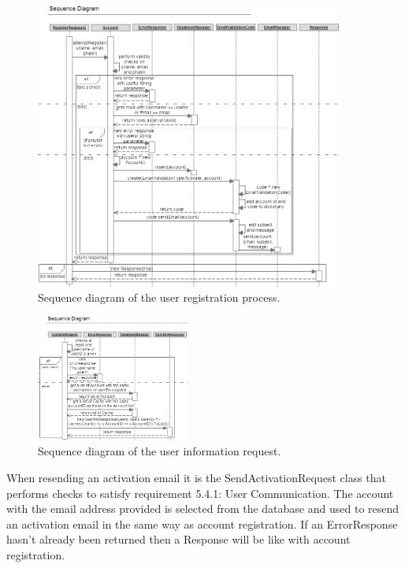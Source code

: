\begin{figure}
    \centering
    \includegraphics[width=0.9\textwidth]{images/sequence/registerUser}
    \caption{Sequence diagram of the user registration process.}
\end{figure}

\begin{figure}
    \includegraphics[width=0.45\textwidth]{images/sequence/userinfo}
    \caption{Sequence diagram of the user information request.}
    \label{fig:userInfo}
\end{figure}

When resending an activation email it is the SendActivationRequest class that performs checks to satisfy requirement 5.4.1: User Communication. The account with the email address provided is selected from the database and used to resend an activation email in the same way as account registration. If an ErrorResponse hasn't already been returned then a Response will be like with account registration.

